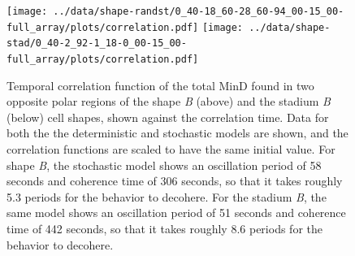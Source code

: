 \documentclass[10pt,letterpaper]{article}
\begin{document}


\begin{figure}
  \begin{center}
    \texttt{[image: ../data/shape-randst/0\_40-18\_60-28\_60-94\_00-15\_00-full\_array/plots/correlation.pdf]}
    \texttt{[image: ../data/shape-stad/0\_40-2\_92-1\_18-0\_00-15\_00-full\_array/plots/correlation.pdf]}
  \end{center}
  \caption{Temporal correlation function of the total MinD found in
    two opposite polar regions of the shape \emph{B} (above) and the
    stadium \emph{B} (below) cell shapes, shown against the
    correlation time.  Data for both the the deterministic and
    stochastic models are shown, and the correlation functions are
    scaled to have the same initial value.  For shape \emph{B}, the
    stochastic model shows an oscillation period of 58 seconds and
    coherence time of 306 seconds, so that it takes roughly 5.3 periods
    for the behavior to decohere.  For the stadium \emph{B}, the same
    model shows an oscillation period of 51 seconds and coherence time
    of 442 seconds, so that it takes roughly 8.6 periods for the
    behavior to decohere.}
  \label{fig:corr-B}
\end{figure}
\end{document}

